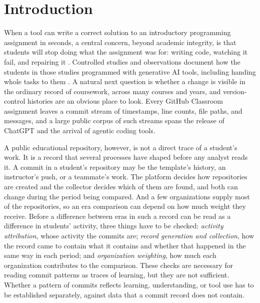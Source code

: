 \documentclass[acmsmall,screen,review,anonymous]{acmart}
\begin{document}

\maketitle

\section{Introduction}
\label{sec:intro}

When a tool can write a correct solution to an introductory programming assignment in seconds, a central concern, beyond academic integrity, is that students will stop doing what the assignment was for: writing code, watching it fail, and repairing it \citep{denny2024computing, prather2024widening, finnieansley2022robots}. Controlled studies and observations document how the students in those studies programmed with generative AI tools, including handing whole tasks to them \citep{shihab2025copilot, kazemitabaar2023novices, prather2023weird}. A natural next question is whether a change is visible in the ordinary record of coursework, across many courses and years, and version-control histories are an obvious place to look. Every GitHub Classroom assignment leaves a commit stream of timestamps, line counts, file paths, and messages, and a large public corpus of such streams spans the release of ChatGPT and the arrival of agentic coding tools.

A public educational repository, however, is not a direct trace of a student's work. It is a record that several processes have shaped before any analyst reads it. A commit in a student's repository may be the template's history, an instructor's push, or a teammate's work. The platform decides how repositories are created and the collector decides which of them are found, and both can change during the period being compared. And a few organizations supply most of the repositories, so an era comparison can depend on how much weight they receive. Before a difference between eras in such a record can be read as a difference in students' activity, three things have to be checked: \textit{activity attribution}, whose activity the commits are; \textit{record generation and collection}, how the record came to contain what it contains and whether that happened in the same way in each period; and \textit{organization weighting}, how much each organization contributes to the comparison. These checks are necessary for reading commit patterns as traces of learning, but they are not sufficient. Whether a pattern of commits reflects learning, understanding, or tool use has to be established separately, against data that a commit record does not contain.
\end{document}
